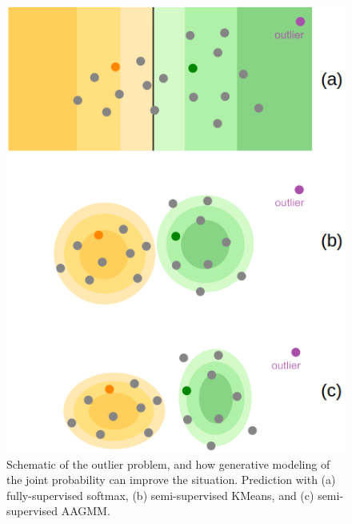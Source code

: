\documentclass[10pt,twocolumn,letterpaper]{article}
\begin{document}
\begin{figure}[ht]
	\centering
	\includegraphics[width=0.8\linewidth]{figures/illustration.png}
	\caption{Schematic of the outlier problem, and how generative modeling of the joint probability can improve the situation.  Prediction with (a) fully-supervised softmax, (b) semi-supervised KMeans, and (c) semi-supervised AAGMM.} 
	\label{fig:schema}
\end{figure}
\end{document}

